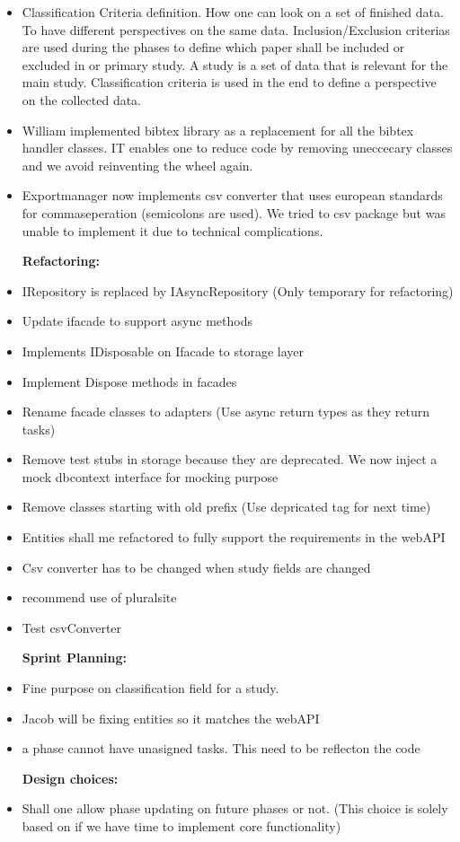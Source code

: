 \begin{itemize}
	\item Classification Criteria definition. How one can look on a set of finished data. To have different perspectives on the same data. Inclusion/Exclusion criterias are used during the phases to define which paper shall be included or excluded in or primary study. A study is a set of data that is relevant for the main study. Classification criteria is used in the end to define a perspective on the collected data.
	\item William implemented bibtex library as a replacement for all the bibtex handler classes. IT enables one to reduce code by removing uneccecary classes and we avoid reinventing the wheel again.
	\item Exportmanager now implements csv converter that  uses european standards for commaseperation (semicolons are used).  We tried to csv package but was unable to implement it due to technical complications.
\end{itemize}

\begin{itemize}
	\item [\textbf{Refactoring:}]
	\item IRepository is replaced by IAsyncRepository (Only temporary for refactoring)
	\item Update ifacade to support async methods
	\item Implements IDisposable on Ifacade to storage layer
	\item Implement Dispose methods in facades
	\item Rename facade classes to adapters (Use async return types as they return tasks)
	\item Remove test stubs in storage because they are deprecated. We now inject a mock dbcontext interface for mocking purpose
	\item Remove classes starting with old prefix (Use depricated tag for next time)
	\item Entities shall me refactored to fully support the requirements in the webAPI
	\item Csv converter has to be changed when study fields are changed
	\item recommend use of pluralsite
	\item Test csvConverter
\end{itemize}

\begin{itemize}
	\item [\textbf{Sprint Planning:}]
	\item Fine purpose on classification field for a study.
	\item Jacob will be fixing entities so it matches the webAPI
	\item a phase cannot have unasigned tasks. This need to be reflecton the code 	
\end{itemize}

\begin{itemize}
	\item [\textbf{Design choices:}]
	\item Shall one allow phase updating on future phases or not. (This choice is solely based on if we have time to implement core functionality)
\end{itemize}
